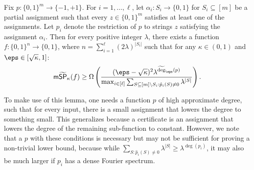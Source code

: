 \documentclass{toc}
\begin{document}
\begin{lemma}\label{lem:better-version}
Fix $p:\{0,1\}^m\rightarrow\{-1,+1\}$. For $i=1,\dots,\ell$, let $\alpha_i:S_i\rightarrow\{0,1\}$ for $S_i\subseteq[m]$ be a partial assignment such that every $z\in\{0,1\}^m$ satisfies at least one of the assignments.
Let $p_i$ denote the restriction of $p$ to strings $z$ satisfying the assignment $\alpha_i$. Then for every positive integer $\lambda$, there exists a function $f:\{0,1\}^n\rightarrow\{0,1\}$, where $n=\sum_{i=1}^{\ell}(2\lambda)^{|S_i|}$ such that for any $\kappa\in (0,1)$ and $\eps\in[\sqrt{\kappa},1]$:
\begin{align*}
\mathsf{m}\widetilde{\mathsf{SP}}_\kappa(f)\geq \Omega\left(\frac{(\eps-\sqrt{\kappa})^2\lambda^{\widetilde{\deg}_{\eps}(p)}}{\max_{i\in [\ell]}\sum_{S\subseteq[m]\setminus S_i:\hat{p}_i(S)\neq 0}\lambda^{|S|}}\right).
\end{align*}
\end{lemma}
To make use of this lemma, one needs a function $p$ of high approximate degree, such that for every input, there is a small assignment that lowers the degree to something small. This generalizes  because a certificate is an assignment that lowers the degree of the remaining sub-function to constant. However, we note that a $p$ with these conditions is necessary but may not be sufficient for proving a non-trivial lower bound, because while $\sum_{S:\hat{p}_i(S)\neq 0}\lambda^{|S|}\geq \lambda^{\deg(p_i)}$, it may also be much larger if $p_i$ has a dense Fourier spectrum. 
\end{document}
